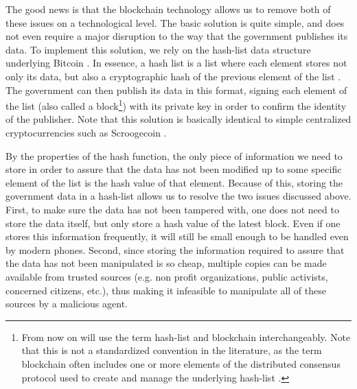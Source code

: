 The good news is that the blockchain technology allows us to remove both of these issues on a technological level. The basic solution is quite simple, and does not even require a major disruption to the way that the government publishes its data. To implement this solution, we rely on the hash-list data structure underlying Bitcoin \cite{whitepaper,bitcoinbook}. In essence, a hash list is a list where each element stores not only its data, but also a cryptographic hash of the previous element of the list \cite{bitcoinbook}. The government can then publish its data in this format, signing each element of the list (also called a block\footnote{From now on will use the term hash-list and blockchain interchangeably. Note that this is not a standardized convention in the literature, as the term blockchain often includes one or more elements of the distributed consensus protocol used to create and manage the underlying hash-list \cite{NarayananC17}.}) with its private key in order to confirm the identity of the publisher. Note that this solution is basically identical to simple centralized cryptocurrencies such as Scroogecoin \cite{bitcoinbook}.

By the properties of the hash function, the only piece of information we need to store in order to assure that the data has not been modified up to some specific element of the list is the hash value of that element. Because of this, storing the government data in a hash-list allows us to resolve the two issues discussed above. First, to make sure the data has not been tampered with, one does not need to store the data itself, but only store a hash value of the latest block. Even if one stores this information frequently, it will still be small enough to be handled even by modern phones. Second, since storing the information required to assure that the data has not been manipulated is so cheap, multiple copies can be made available from trusted sources (e.g. non profit organizations, public activists, concerned citizens, etc.), thus making it infeasible to manipulate all of these sources by a malicious agent.






